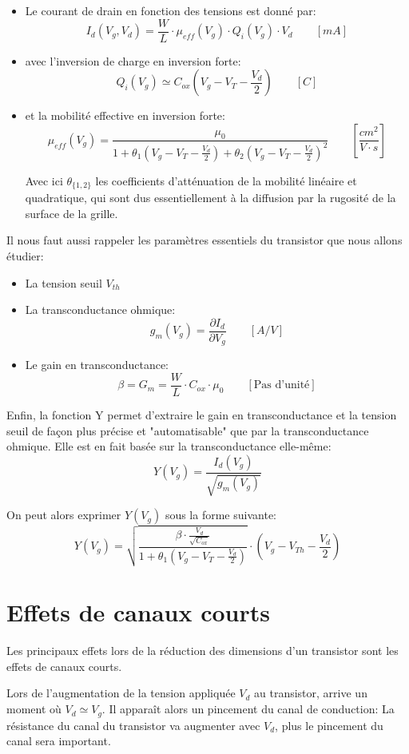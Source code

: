 \documentclass[a4paper,11pt]{report}
\begin{document}
\begin{itemize}
    \item Le courant de drain en fonction des tensions est donné par:
        \[I_d (V_g, V_d) = \frac{W}{L} \cdot \mu_{eff}(V_g) \cdot Q_i(V_g) \cdot V_d \qquad [mA]\]
    \item avec l'inversion de charge en inversion forte:
        \[Q_i(V_g) \simeq C_{ox}(V_g - V_T - \frac{V_d}{2}) \qquad [C]\]
    \item et la mobilité effective en inversion forte:
        \[\mu_{eff}(V_g) =\frac{\mu_0}{1+\theta_1 (V_g - V_T - \frac{V_d}{2})
                                        +\theta_2 (V_g - V_T - \frac{V_d}{2})^2} \qquad [\frac{cm^2}{V\cdot s}] \]

        Avec ici $\theta_{\{1,2\}}$ les coefficients d'atténuation de la mobilité linéaire et quadratique, qui sont dus essentiellement à la diffusion par la rugosité de la surface de la grille.
\end{itemize}

Il nous faut aussi rappeler les paramètres essentiels du transistor que nous allons étudier:
\begin{itemize}
    \item La tension seuil $V_{th}$
    \item La transconductance ohmique:
        \[g_m (V_g) = \dfrac{\partial I_d}{\partial V_g} \qquad [A/V]\]
    \item Le gain en transconductance:
        \[\beta = G_m = \dfrac{W}{L} \cdot C_{ox} \cdot \mu_0 \qquad [\text{Pas d'unité}]\]
\end{itemize}

Enfin, la fonction Y permet d'extraire le gain en transconductance et la tension seuil de façon plus précise et "automatisable" que par la transconductance ohmique. Elle est en fait basée sur la transconductance elle-même:
\[ Y(V_g) = \frac{I_d(V_g)}{\sqrt{g_m(V_g)}}
\]

On peut alors exprimer $Y(V_g)$ sous la forme suivante:
\[Y(V_g) = \sqrt{\frac{\beta \cdot \frac{V_d}{\sqrt{C_{ox}}}}{1+ \theta_1 (V_g - V_T - \frac{V_d}{2})}} \cdot (V_g - V_{Th} - \frac{V_d}{2})
\]

\section{Effets de canaux courts}
Les principaux effets lors de la réduction des dimensions d'un transistor sont les effets de canaux courts.

Lors de l'augmentation de la tension appliquée $V_d$ au transistor, arrive un moment où $V_d \simeq V_g$. Il apparaît alors un pincement du canal de conduction: La résistance du canal du transistor va augmenter avec $V_d$, plus le pincement du canal sera important.
\end{document}
